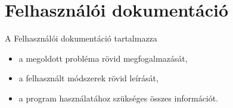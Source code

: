 
\chapter{Felhasználói dokumentáció}

A Felhasználói dokumentáció tartalmazza
\begin{itemize}
\item a megoldott probléma rövid megfogalmazását,
\item a felhasznált módszerek rövid leírását,
\item a program használatához szükséges összes információt.
\end{itemize}
